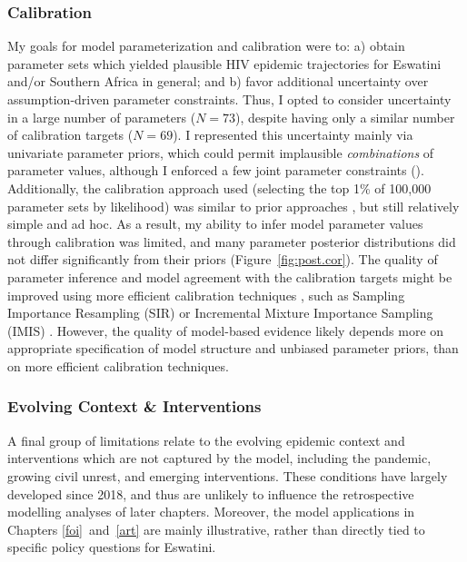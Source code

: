 \subsubsection{Calibration}\label{model.disc.lim.cal}
My goals for model parameterization and calibration were to:
a) obtain parameter sets which yielded plausible HIV epidemic trajectories for
Eswatini and/or Southern Africa in general; and
b) favor additional uncertainty over assumption-driven parameter constraints.
Thus, I opted to consider uncertainty in a large number of parameters ($N = 73$),
despite having only a similar number of calibration targets ($N = 69$).
I represented this uncertainty mainly via univariate parameter priors,
which could permit implausible \emph{combinations} of parameter values,
although I enforced a few joint parameter constraints ().
Additionally, the calibration approach used
(selecting the top 1\% of 100,000 parameter sets by likelihood)
was similar to prior approaches \cite{Johnson2010}, but still relatively simple and ad hoc.
As a result, my ability to infer model parameter values through calibration was limited,
and many parameter posterior distributions did not differ significantly from their priors
(Figure~\ref{fig:post.cor}).
The quality of parameter inference and model agreement with the calibration targets
might be improved using more efficient calibration techniques \cite{Menzies2017}, such as
Sampling Importance Resampling (SIR) \cite{Rubin1987} or
Incremental Mixture Importance Sampling (IMIS) \cite{Raftery2010}.
However, the quality of model-based evidence likely depends
more on appropriate specification of model structure and unbiased parameter priors,
than on more efficient calibration techniques.
\subsubsection{Evolving Context \& Interventions}\label{model.disc.lim.evo}
A final group of limitations relate to the evolving epidemic context and interventions
which are not captured by the model, including
the \covid pandemic, growing civil unrest, and emerging interventions.
These conditions have largely developed since 2018, and thus
are unlikely to influence the retrospective modelling analyses of later chapters.
Moreover, the model applications in Chapters \ref{foi}~and~\ref{art} are mainly illustrative,
rather than directly tied to specific policy questions for Eswatini.
\pagebreak %
